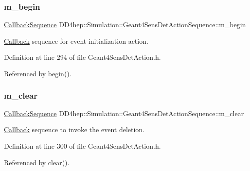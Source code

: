 \subsubsection{\texorpdfstring{m\+\_\+begin}{m\_begin}}
{\footnotesize\ttfamily \hyperlink{struct_d_d4hep_1_1_callback_sequence}{Callback\+Sequence} D\+D4hep\+::\+Simulation\+::\+Geant4\+Sens\+Det\+Action\+Sequence\+::m\+\_\+begin\hspace{0.3cm}{\ttfamily [protected]}}



\hyperlink{class_d_d4hep_1_1_callback}{Callback} sequence for event initialization action. 



Definition at line 294 of file Geant4\+Sens\+Det\+Action.\+h.



Referenced by begin().

\hypertarget{class_d_d4hep_1_1_simulation_1_1_geant4_sens_det_action_sequence_a5d720697074ed4775143ebdae2073a16}{}\label{class_d_d4hep_1_1_simulation_1_1_geant4_sens_det_action_sequence_a5d720697074ed4775143ebdae2073a16} 
\subsubsection{\texorpdfstring{m\+\_\+clear}{m\_clear}}
{\footnotesize\ttfamily \hyperlink{struct_d_d4hep_1_1_callback_sequence}{Callback\+Sequence} D\+D4hep\+::\+Simulation\+::\+Geant4\+Sens\+Det\+Action\+Sequence\+::m\+\_\+clear\hspace{0.3cm}{\ttfamily [protected]}}



\hyperlink{class_d_d4hep_1_1_callback}{Callback} sequence to invoke the event deletion. 



Definition at line 300 of file Geant4\+Sens\+Det\+Action.\+h.



Referenced by clear().

\hypertarget{class_d_d4hep_1_1_simulation_1_1_geant4_sens_det_action_sequence_a58c74511f9bef97e83b5a7e54b4917ca}{}\label{class_d_d4hep_1_1_simulation_1_1_geant4_sens_det_action_sequence_a58c74511f9bef97e83b5a7e54b4917ca} 
